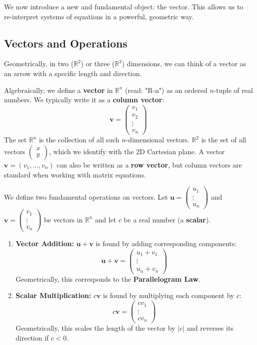 We now introduce a new and fundamental object: the vector. This allows us to re-interpret systems of equations in a powerful, geometric way.

\subsection{Vectors and Operations}
Geometrically, in two ($\mathbb{R}^2$) or three ($\mathbb{R}^3$) dimensions, we can think of a vector as an arrow with a specific length and direction.


Algebraically, we define a \textbf{vector} in $\mathbb{R}^n$ (read: "R-n") as an ordered $n$-tuple of real numbers. We typically write it as a \textbf{column vector}:
\[ \mathbf{v} = \begin{pmatrix} v_1 \\ v_2 \\ \vdots \\ v_n \end{pmatrix} \]
The set $\mathbb{R}^n$ is the collection of all such $n$-dimensional vectors. $\mathbb{R}^2$ is the set of all vectors $\begin{pmatrix} x \\ y \end{pmatrix}$, which we identify with the 2D Cartesian plane.
A vector $\mathbf{v} = (v_1, \ldots, v_n)$ can also be written as a \textbf{row vector}, but column vectors are standard when working with matrix equations.

We define two fundamental operations on vectors. Let $\mathbf{u} = \begin{pmatrix} u_1 \\ \vdots \\ u_n \end{pmatrix}$ and $\mathbf{v} = \begin{pmatrix} v_1 \\ \vdots \\ v_n \end{pmatrix}$ be vectors in $\mathbb{R}^n$ and let $c$ be a real number (a \textbf{scalar}).

\begin{enumerate}
    \item \textbf{Vector Addition:} $\mathbf{u} + \mathbf{v}$ is found by adding corresponding components:
    \[ \mathbf{u} + \mathbf{v} = \begin{pmatrix} u_1 + v_1 \\ \vdots \\ u_n + v_n \end{pmatrix} \]
    Geometrically, this corresponds to the \textbf{Parallelogram Law}.
    \item \textbf{Scalar Multiplication:} $c\mathbf{v}$ is found by multiplying each component by $c$:
    \[ c\mathbf{v} = \begin{pmatrix} cv_1 \\ \vdots \\ cv_n \end{pmatrix} \]
    Geometrically, this scales the length of the vector by $|c|$ and reverses its direction if $c < 0$.
\end{enumerate}

